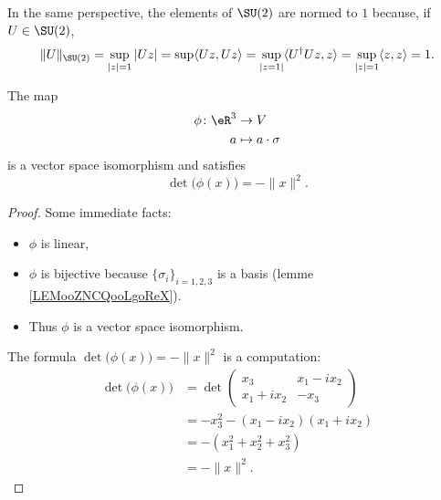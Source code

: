 In the same perspective, the elements of \( \SU(2)\) are normed to \( 1\) because, if \( U\in \SU(2)\),
\begin{equation}
    \| U \|_{\SU(2)}=\sup_{| z |=1}| Uz |=\sup\langle Uz, Uz\rangle =\sup_{| z=1 |}\langle U^{\dag}Uz, z\rangle =\sup_{| z |=1} \langle z, z\rangle=1.
\end{equation}

\begin{lemma}       \label{LEMooRFBTooIRDbEq}
    The map
    \begin{equation}
        \begin{aligned}
            \phi\colon \eR^3&\to V \\
            a&\mapsto a\cdot \sigma 
        \end{aligned}
    \end{equation}
    is a vector space isomorphism and satisfies
    \begin{equation}
        \det\big( \phi(x) \big)=-\| x \|^2.
    \end{equation}
\end{lemma}
 
\begin{proof}
    Some immediate facts:
    \begin{itemize}
        \item \( \phi\) is linear,
        \item \( \phi\) is bijective because \( \{ \sigma_i \}_{i=1,2,3}\) is a basis (lemme \ref{LEMooZNCQooLgoReX}).
        \item Thus \( \phi\) is a vector space isomorphism.
    \end{itemize}
    The formula \( \det\big( \phi(x) \big)=-\| x \|^2\) is a computation:
    \begin{subequations}
        \begin{align}
        \det\big( \phi(x) \big)&=\det\begin{pmatrix}
            x_3    &   x_1-ix_2    \\ 
            x_1+ix_2    &   -x_3
        \end{pmatrix}\\
        &=-x_3^2-(x_1-ix_2)(x_1+ix_2)\\
        &=-(x_1^2+x_2^2+x_3^2)\\
        &=-\| x \|^2.
        \end{align}
    \end{subequations}
\end{proof}

